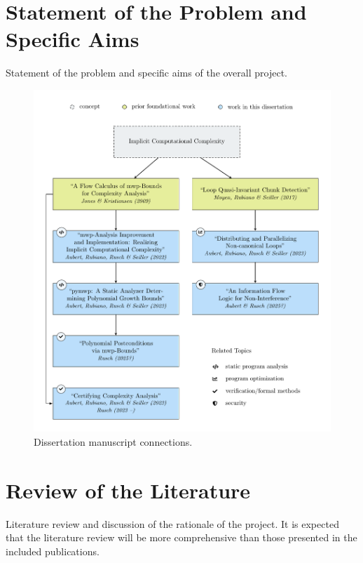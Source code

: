 \clearpage\section{Statement of the Problem and Specific Aims}\label{intro}

Statement of the problem and specific aims of the overall project.


\begin{figure}
\centering
\includegraphics[width=\linewidth,height=\textheight,keepaspectratio]{pdf/fig_conn_papers.pdf}
\caption{Dissertation manuscript connections.}\label{fig:conn_papers}
\end{figure}


\clearpage\section{Review of the Literature}\label{sec:pre}

Literature review and discussion of the rationale of the project.
It is expected that the literature review will be more comprehensive than
those presented in the included publications.
